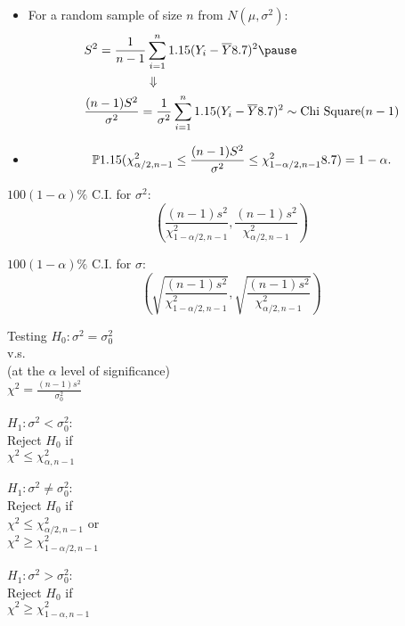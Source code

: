 \begin{frame}
\begin{itemize}
	\item[]  For a random sample of size $n$ from $N(\mu,\sigma^2)$:
	\begin{align*}
	&S^2 =\frac{1}{n-1}\sum_{i=1}^n \left(Y_i-\overline{Y}\right)^2
	\pause \\ &\hspace{5em} \Downarrow\\
	&\frac{(n-1)S^2}{\sigma^2} = \frac{1}{\sigma^2}\sum_{i=1}^n \left(Y_i-\overline{Y}\right)^2
	\sim \text{Chi Square}(n-1)
	\end{align*}
	\item[] \pause
	\[
	\mathbb{P}1.15(\chi_{\alpha/2,n-1}^2 \le \frac{(n-1)S^2}{\sigma^2}\le \chi_{1-\alpha/2,n-1}^2 8.7)=1-\alpha.
	\]
\end{itemize}
\vfill
\pause
\begin{minipage}{0.45\textwidth}
	\centering
	$100(1-\alpha)\%$ C.I. for $\sigma^2$:
	\[
		\left(\frac{(n-1)s^2}{\chi^2_{1-\alpha/2,n-1}},  \frac{(n-1)s^2}{\chi^2_{\alpha/2,n-1}}\right)
	\]
\end{minipage}
\quad
\begin{minipage}{0.45\textwidth}
	\centering
	$100(1-\alpha)\%$ C.I. for $\sigma$:
	\[
		\left(\sqrt{\frac{(n-1)s^2}{\chi^2_{1-\alpha/2,n-1} }},  \sqrt{\frac{(n-1)s^2}{\chi^2_{\alpha/2,n-1} }}\right)
	\]
\end{minipage}
\end{frame}
\begin{frame}
\centering
Testing $H_0:\sigma^2 = \sigma_0^2$ \\[1em] v.s.\\[1em]
(at the $\alpha$ level of significance)
\\[1em]
$\chi^2 = \frac{(n-1)s^2}{\sigma_0^2}$
\vfill

\begin{minipage}{0.32\textwidth}
\centering
$H_1:\sigma^2<\sigma_0^2$:\\[1em]
Reject $H_0$ if \\[1em]
$\chi^2 \le \chi_{\alpha,n-1}^2$
\end{minipage}
\begin{minipage}{0.32\textwidth}
\centering
$H_1:\sigma^2\ne \sigma_0^2$:\\[1em]
Reject $H_0$ if \\[1em]
$\chi^2 \le \chi_{\alpha/2,n-1}^2$ or \\[1em]
$\chi^2 \ge \chi_{1-\alpha/2,n-1}^2$
\end{minipage}
\begin{minipage}{0.32\textwidth}
\centering
$H_1:\sigma^2>\sigma_0^2$:\\[1em]
Reject $H_0$ if \\[1em]
$\chi^2 \ge \chi_{1-\alpha,n-1}^2$
\end{minipage}
\end{frame}
